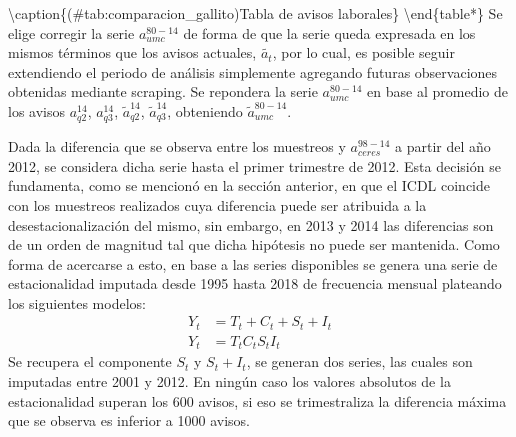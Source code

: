 \documentclass[12pt,twoside]{reedthesis}
\begin{document}
\textbackslash{}caption\{(\#tab:comparacion\_gallito)Tabla de avisos laborales\}
\centering
{}
\textbackslash{}end\{table*\}
Se elige corregir la serie \(a_{umc}^{80-14}\) de forma de que la serie queda expresada en los mismos términos que los avisos actuales, \(\tilde{a_t}\), por lo cual, es posible seguir extendiendo el periodo de análisis simplemente agregando futuras observaciones obtenidas mediante scraping. Se repondera la serie \(a_{umc}^{80-14}\) en base al promedio de los avisos \(a_{q2}^{14}\), \(a_{q3}^{14}\), \(\tilde{a}_{q2}^{14}\), \(\tilde{a}_{q3}^{14}\), obteniendo \(\tilde{a}_{umc}^{80-14}\).

Dada la diferencia que se observa entre los muestreos y \(a_{ceres}^{98-14}\) a partir del año 2012, se considera dicha serie hasta el primer trimestre de 2012. Esta decisión se fundamenta, como se mencionó en la sección anterior, en que el ICDL coincide con los muestreos realizados cuya diferencia puede ser atribuida a la desestacionalización del mismo, sin embargo, en 2013 y 2014 las diferencias son de un orden de magnitud tal que dicha hipótesis no puede ser mantenida.
Como forma de acercarse a esto, en base a las series disponibles se genera una serie de estacionalidad imputada desde 1995 hasta 2018 de frecuencia mensual plateando los siguientes modelos:
\[
\begin{aligned}
Y_t &= T_t + C_t + S_t + I_t \\
Y_t &= T_t C_t S_t I_t
\end{aligned}
\]
Se recupera el componente \(S_t\) y \(S_t + I_t\), se generan dos series, las cuales son imputadas entre 2001 y 2012. En ningún caso los valores absolutos de la estacionalidad superan los 600 avisos, si eso se trimestraliza la diferencia máxima que se observa es inferior a 1000 avisos.
\end{document}
